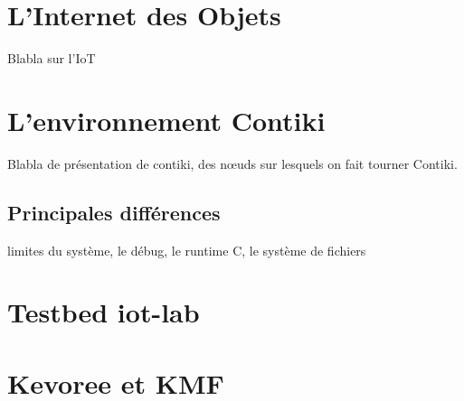 \section{L'Internet des Objets}

Blabla sur l'IoT

\section{L'environnement Contiki}

Blabla de présentation de contiki, des nœuds sur lesquels on fait tourner Contiki.

\subsection{Principales différences}

limites du système, le débug, le runtime C, le système de fichiers


\section{Testbed iot-lab}


\section{Kevoree et KMF}